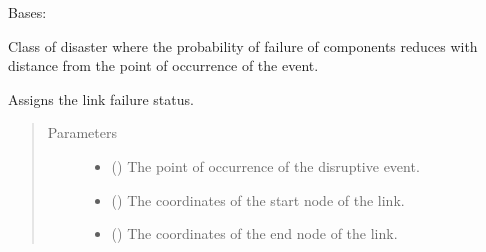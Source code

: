 \documentclass[letterpaper,10pt,english]{sphinxmanual}
\begin{document}
\begin{fulllineitems}
\label{\detokenize{apidoc:dreaminsg_integrated_model.src.hazard_initiator.RadialDisruption}}
\sphinxAtStartPar
Bases: 

\sphinxAtStartPar
Class of disaster where the probability of failure of components reduces with distance from the point of occurrence of the event.

\begin{fulllineitems}
\label{\detokenize{apidoc:dreaminsg_integrated_model.src.hazard_initiator.RadialDisruption.assign_link_failure}}
\sphinxAtStartPar
Assigns the link failure status.
\begin{quote}\begin{description}
\item[{Parameters}] \leavevmode\begin{itemize}
\item {} 
\sphinxAtStartPar
{} () \textendash{} The point of occurrence of the disruptive event.

\item {} 
\sphinxAtStartPar
{} () \textendash{} The coordinates of the start node of the link.

\item {} 
\sphinxAtStartPar
{} () \textendash{} The coordinates of the end node of the link.


\end{itemize}
\end{description}
\end{quote}
\end{fulllineitems}
\end{fulllineitems}
\end{document}

